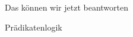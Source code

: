 \begin{frame}[fragile]{Das können wir jetzt beantworten}
	\begin{alertblock}{Prädikatenlogik}
		\begin{itemize}
		\end{itemize}
	\end{alertblock}
\end{frame}